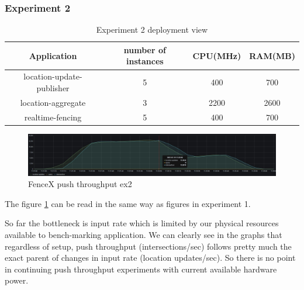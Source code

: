 \documentclass[a4]{report}
\begin{document}
    \clearpage

    \subsubsection{Experiment 2}
    \begin{table}[h!]
        \centering
        \begin{tabular}{|c|c|c|c|}
            \hline
            Application               & number of instances & CPU(MHz) & RAM(MB) \\
            \hline
            location-update-publisher & 5                   & 400      & 700     \\
            location-aggregate        & 3                   & 2200     & 2600    \\
            realtime-fencing          & 5                   & 400      & 700     \\
            \hline
        \end{tabular}
        \caption{Experiment 2 deployment view}
        \label{table:ex2-dv}
    \end{table}

    \begin{figure}[h!]
        \caption{FenceX push throughput ex2}
        \label{fig:ex2}
        \includegraphics[scale=0.4]{images/evaluation/ex2-benchmarking(24,10).png}
    \end{figure}
    The figure \ref{fig:ex2} can be read in the same way as figures in experiment 1.

    So far the bottleneck is input rate which is limited by our physical resources available to bench-marking
    application.
    We can clearly see in the graphs that regardless of setup, push throughput (intersections/sec) follows pretty
    much the exact parent of changes in input rate (location updates/sec).
    So there is no point in continuing push throughput experiments with current available hardware power.

    \clearpage
\end{document}
